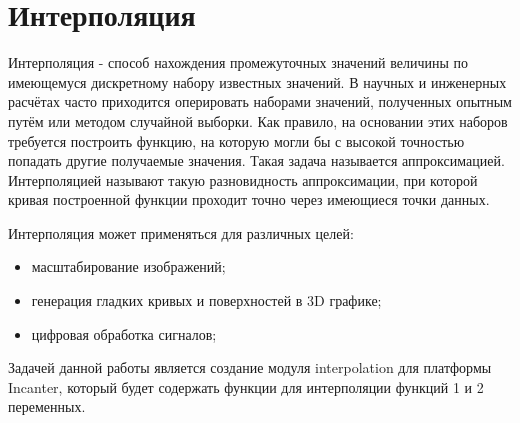 \section{Интерполяция}

Интерполяция - способ нахождения промежуточных значений величины по имеющемуся дискретному набору известных значений. В научных и инженерных расчётах часто приходится оперировать наборами значений, полученных опытным путём или методом случайной выборки. Как правило, на основании этих наборов требуется построить функцию, на которую могли бы с высокой точностью попадать другие получаемые значения. Такая задача называется аппроксимацией. Интерполяцией называют такую разновидность аппроксимации, при которой кривая построенной функции проходит точно через имеющиеся точки данных.

Интерполяция может применяться для различных целей:

\begin{itemize}
\item масштабирование изображений;

\item генерация гладких кривых и поверхностей в 3D графике;

\item цифровая обработка сигналов;
\end{itemize}

Задачей данной работы является создание модуля interpolation для платформы Incanter, который будет содержать функции для интерполяции функций 1 и 2 переменных.

